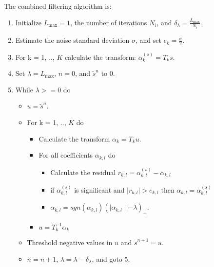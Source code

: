 The combined filtering algorithm is:
\begin{enumerate}
\baselineskip=0.4truecm
\itemsep=0.1truecm
\item Initialize $L_{\max} = 1$, the number of iterations $N_i$, and
  $\delta_{\lambda} = \frac{L_{\max}}{N_i}$.
\item Estimate the noise standard deviation $\sigma$, and set $e_k =
  \frac{\sigma}{2}$.
\item For k = 1, .., $K$ calculate the transform: $\alpha^{(s)}_k
  = T_k s$.
\item Set $\lambda = L_{\max}$, $n = 0$, and $\tilde s^{n}$ to 0.
\item While $\lambda >= 0$ do
\begin{itemize}
\item $u = \tilde s^{n}$.
\item For k = 1, .., $K$ do
  \begin{itemize}
  \item Calculate the transform $\alpha_{k} = T_k u$.
  \item For all coefficients $\alpha_{k,l}$ do
     \begin{itemize}
     \item Calculate the residual $r_{k,l} = \alpha^{(s)}_{k,l} -
       \alpha_{k,l}$
       
     \item if $\alpha^{(s)}_{k,l}$ is significant and $ \mid r_{k,l}
       \mid > e_{k,l}$ then $\alpha_{k,l} = \alpha^{(s)}_{k,l}$
     \item $\alpha_{k,l} = sgn(\alpha_{k,l}) ( \mid \alpha_{k,l} \mid - \lambda)_{+}$.
     \end{itemize}
   \item $u = T_k^{-1} \alpha_{k}$
  \end{itemize}
\item Threshold negative values in $u$ and $\tilde s^{n+1} = u$.
\item $n = n + 1$, $\lambda = \lambda - \delta_{\lambda} $, and goto 5.
\end{itemize}
\end{enumerate}
 
